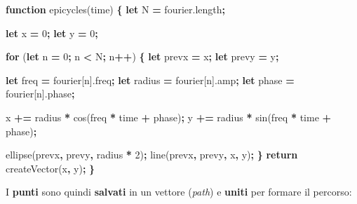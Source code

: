 \documentclass[
]{book}
\newenvironment{Shaded}{\begin{snugshade}}{\end{snugshade}}
\newcommand{\AttributeTok}[1]{\textcolor[rgb]{0.77,0.63,0.00}{#1}}
\newcommand{\ControlFlowTok}[1]{\textcolor[rgb]{0.13,0.29,0.53}{\textbf{#1}}}
\newcommand{\DecValTok}[1]{\textcolor[rgb]{0.00,0.00,0.81}{#1}}
\newcommand{\KeywordTok}[1]{\textcolor[rgb]{0.13,0.29,0.53}{\textbf{#1}}}
\newcommand{\NormalTok}[1]{#1}
\newcommand{\OperatorTok}[1]{\textcolor[rgb]{0.81,0.36,0.00}{\textbf{#1}}}
\newcommand{\VariableTok}[1]{\textcolor[rgb]{0.00,0.00,0.00}{#1}}
\begin{document}
\begin{Shaded}
\begin{Highlighting}[]
\KeywordTok{function} \AttributeTok{epicycles}\NormalTok{(time) }\OperatorTok{\{}
  \KeywordTok{let}\NormalTok{ N }\OperatorTok{=} \VariableTok{fourier}\NormalTok{.}\AttributeTok{length}\OperatorTok{;}
  
  \KeywordTok{let}\NormalTok{ x }\OperatorTok{=} \DecValTok{0}\OperatorTok{;}
  \KeywordTok{let}\NormalTok{ y }\OperatorTok{=} \DecValTok{0}\OperatorTok{;}

  \ControlFlowTok{for}\NormalTok{ (}\KeywordTok{let}\NormalTok{ n }\OperatorTok{=} \DecValTok{0}\OperatorTok{;}\NormalTok{ n }\OperatorTok{<}\NormalTok{ N}\OperatorTok{;}\NormalTok{ n}\OperatorTok{++}\NormalTok{) }\OperatorTok{\{}
    \KeywordTok{let}\NormalTok{ prevx }\OperatorTok{=}\NormalTok{ x}\OperatorTok{;}
    \KeywordTok{let}\NormalTok{ prevy }\OperatorTok{=}\NormalTok{ y}\OperatorTok{;}

    \KeywordTok{let}\NormalTok{ freq }\OperatorTok{=}\NormalTok{ fourier[n].}\AttributeTok{freq}\OperatorTok{;}
    \KeywordTok{let}\NormalTok{ radius }\OperatorTok{=}\NormalTok{ fourier[n].}\AttributeTok{amp}\OperatorTok{;}
    \KeywordTok{let}\NormalTok{ phase }\OperatorTok{=}\NormalTok{ fourier[n].}\AttributeTok{phase}\OperatorTok{;}

\NormalTok{    x }\OperatorTok{+=}\NormalTok{ radius }\OperatorTok{*} \AttributeTok{cos}\NormalTok{(freq }\OperatorTok{*}\NormalTok{ time }\OperatorTok{+}\NormalTok{ phase)}\OperatorTok{;}
\NormalTok{    y }\OperatorTok{+=}\NormalTok{ radius }\OperatorTok{*} \AttributeTok{sin}\NormalTok{(freq }\OperatorTok{*}\NormalTok{ time }\OperatorTok{+}\NormalTok{ phase)}\OperatorTok{;}

    \AttributeTok{ellipse}\NormalTok{(prevx}\OperatorTok{,}\NormalTok{ prevy}\OperatorTok{,}\NormalTok{ radius }\OperatorTok{*} \DecValTok{2}\NormalTok{)}\OperatorTok{;}
    \AttributeTok{line}\NormalTok{(prevx}\OperatorTok{,}\NormalTok{ prevy}\OperatorTok{,}\NormalTok{ x}\OperatorTok{,}\NormalTok{ y)}\OperatorTok{;}
  \OperatorTok{\}}
  \ControlFlowTok{return} \AttributeTok{createVector}\NormalTok{(x}\OperatorTok{,}\NormalTok{ y)}\OperatorTok{;}
\OperatorTok{\}}
\end{Highlighting}
\end{Shaded}

I \textbf{punti} sono quindi \textbf{salvati} in un vettore (\emph{path}) e \textbf{uniti} per formare il percorso:
\end{document}
